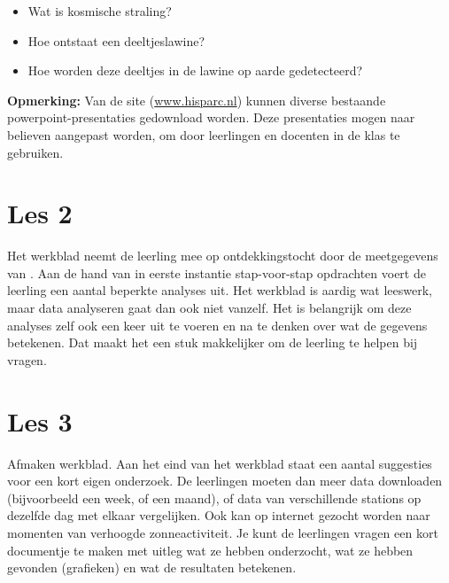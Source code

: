 \begin{itemize}
  \item Wat is kosmische straling?
  \item Hoe ontstaat een deeltjeslawine?
  \item Hoe worden deze deeltjes in de lawine op aarde gedetecteerd?
\end{itemize}

\textbf{Opmerking:}
Van de \hisparc site (\url{www.hisparc.nl}) kunnen diverse bestaande
powerpoint-presentaties gedownload worden. Deze presentaties mogen naar
believen aangepast worden, om door leerlingen en docenten in de klas te
gebruiken.


\section{Les 2}

Het werkblad neemt de leerling mee op ontdekkingstocht door de
meetgegevens van \hisparc. Aan de hand van in eerste instantie
stap-voor-stap opdrachten voert de leerling een aantal beperkte analyses
uit. Het werkblad is aardig wat leeswerk, maar data analyseren gaat dan
ook niet vanzelf. Het is belangrijk om deze analyses zelf ook een keer uit
te voeren en na te denken over wat de gegevens betekenen. Dat maakt het
een stuk makkelijker om de leerling te helpen bij vragen.


\section{Les 3}

Afmaken werkblad. Aan het eind van het werkblad staat een aantal
suggesties voor een kort eigen onderzoek. De leerlingen moeten dan meer
data downloaden (bijvoorbeeld een week, of een maand), of data van
verschillende stations op dezelfde dag met elkaar vergelijken. Ook kan op
internet gezocht worden naar momenten van verhoogde zonneactiviteit. Je
kunt de leerlingen vragen een kort documentje te maken met uitleg wat ze
hebben onderzocht, wat ze hebben gevonden (grafieken) en wat de resultaten
betekenen.


%


